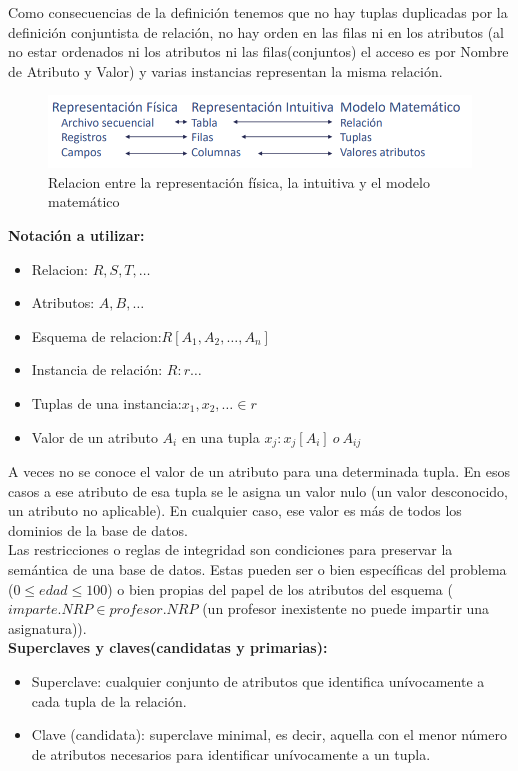 \documentclass[a4paper,11pt]{article}
\begin{document}
Como consecuencias de la definición tenemos que no hay tuplas duplicadas por la definición conjuntista de relación, no hay orden en las filas ni en los atributos (al no estar ordenados ni los atributos ni las filas(conjuntos) el acceso es por Nombre de Atributo y Valor) y varias instancias representan la misma relación.

\begin{figure}[h]
\centering
\includegraphics[scale=1,width=1\textwidth]{representacion_tabla.png}

\caption{Relacion entre la representación física, la intuitiva y el modelo matemático}
\end{figure}

\textbf{Notación a utilizar:}

\begin{itemize}
\item Relacion: $R,S,T,\ldots$
\item Atributos: $A,B,\ldots$
\item Esquema de relacion:$R[A_1,A_2,\ldots,A_n]$
\item Instancia de relación: $R:r\ldots$
\item Tuplas de una instancia:$x_1,x_2,\ldots \in r$
\item Valor de un atributo $A_i$ en una tupla $x_j:x_j[A_i] \> o \> A_{ij}$
\end{itemize}

A veces no se conoce el valor de un atributo para una determinada tupla. En esos casos a ese atributo de esa tupla se le asigna un valor nulo (un valor desconocido, un atributo no aplicable). En cualquier caso, ese valor es más de todos los dominios de la base de datos. \\

Las restricciones o reglas de integridad son condiciones para preservar la semántica de una base de datos. Estas pueden ser o bien específicas del problema ($0 \leq edad \leq 100$) o bien propias del papel de los atributos del esquema ($imparte.NRP \in profesor.NRP$ (un profesor inexistente no puede impartir una asignatura)). \\

\textbf{Superclaves y claves(candidatas y primarias):}
\begin{itemize}
\item Superclave: cualquier conjunto de atributos que identifica unívocamente a cada tupla de la relación.

\item Clave (candidata): superclave minimal, es decir, aquella con el menor número de atributos necesarios para identificar unívocamente a un tupla.
\end{itemize}
\end{document}
